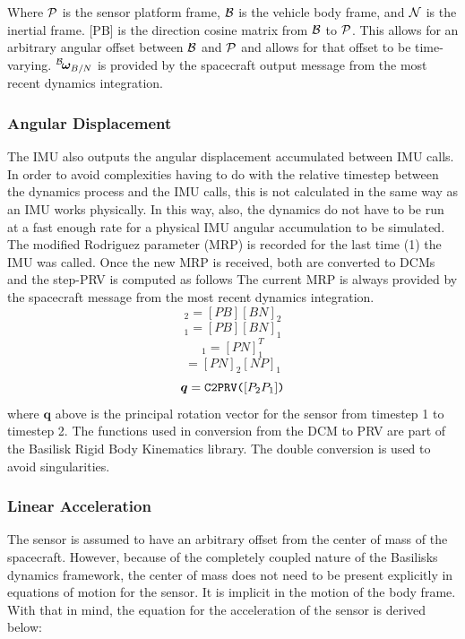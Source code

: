 Where $\cal{P}$ is the sensor platform frame, $\cal{B}$ is the vehicle body frame, and $\cal{N}$ is the inertial frame. [PB] is the direction cosine matrix from $\cal{B}$ to $\cal{P}$. This allows for an arbitrary angular offset between $\cal{B}$ and $\cal{P}$ and allows for that offset to be time-varying. $\leftexp{B}{\bm{\omega}_{B/N}}$ is provided by the spacecraft output message from the most recent dynamics integration.

\subsubsection{Angular Displacement}
The IMU also outputs the angular displacement accumulated between IMU calls. In order to avoid complexities having to do with the relative timestep between the dynamics process and the IMU calls, this is not calculated in the same way as an IMU works physically. In this way, also, the dynamics do not have to be run at a fast enough rate for a physical IMU angular accumulation to be simulated.
The modified Rodriguez parameter (MRP) is recorded for the last time (1) the IMU was called. Once the new MRP is received, both are converted to DCMs and the step-PRV is computed as follows The current MRP is always provided by the spacecraft message from the most recent dynamics integration.
\begin{equation}
	[PN]_2 = [PB][BN]_2
\end{equation}
\begin{equation}
	[PN]_1 = [PB][BN]_1
\end{equation}
\begin{equation}
	[NP]_1 = [PN]_1^T
\end{equation}
\begin{equation}
	[P_2P_1] = [PN]_2[NP]_1
\end{equation}
\begin{equation}
\bm{q} = \verb|C2PRV(|[P_2P_1]\verb|)|
\end{equation}
where $\bm{q}$ above is the principal rotation vector for the sensor from timestep 1 to timestep 2. The functions used in conversion from the DCM to PRV are part of the Basilisk Rigid Body Kinematics library. The double conversion is used to avoid singularities.

\subsubsection{Linear Acceleration}
The sensor is assumed to have an arbitrary offset from the center of mass of the spacecraft. However, because of the completely coupled nature of the Basilisks dynamics framework, the center of mass does not need to be present explicitly in equations of motion for the sensor. It is implicit in the motion of the body frame. With that in mind, the equation for the acceleration of the sensor is derived below:

